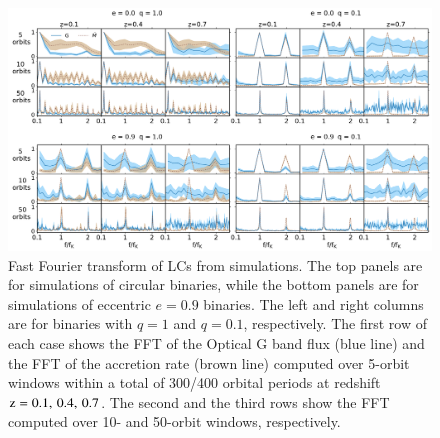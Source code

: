 \documentclass{aa}
\begin{document}
\begin{figure}
        \begin{center}
    \includegraphics[width=18cm]{Figures/e09q01_hr01_md001_3aOptic_FFTmean_bands_comparison_periods_GFILTER_7.pdf}
    \caption{Fast Fourier transform of LCs from simulations. The top panels are for simulations of circular binaries, while the bottom panels are for simulations of eccentric $e=0.9$ binaries. The left and right columns are for binaries with $q=1$ and $q=0.1$, respectively. The first row of each case shows the FFT of the Optical G band flux (blue line) and the FFT of the accretion rate (brown line) computed over 5-orbit windows within a total of 300/400 orbital periods at redshift $\rm{z=0.1,\,0.4,\,0.7}$. The second and the third rows show the FFT computed over 10- and 50-orbit windows, respectively. 
}
    \label{fig:FFTs_comparison_Ltrue}
        \end{center}
\end{figure}
\end{document}
